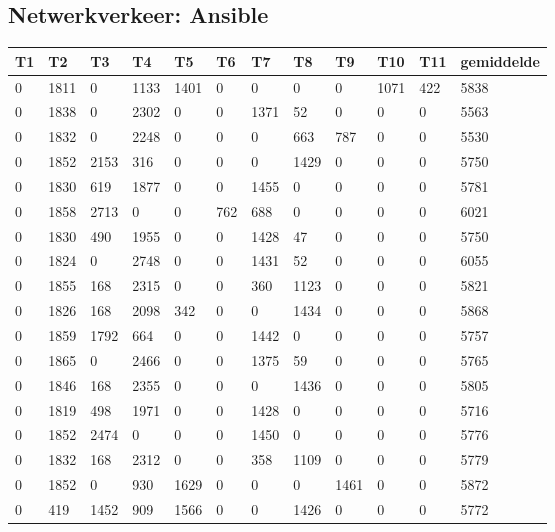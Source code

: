\subsection*{Netwerkverkeer: Ansible}
\label{dataset:netwerkverkeer:ansible}
\begin{longtable}{ | l | l | l | l | l | l | l | l | l | l | l || l | }

	\hline
	T1 & T2 & T3 & T4 & T5 & T6 & T7 & T8 & T9 & T10 & T11 & gemiddelde  \\ \hline
	0 & 1811 & 0 & 1133 & 1401 & 0 & 0 & 0 & 0 & 1071 & 422 & 5838  \\ \hline
	0 & 1838 & 0 & 2302 & 0 & 0 & 1371 & 52 & 0 & 0 & 0 & 5563    \\ \hline
	0 & 1832 & 0 & 2248 & 0 & 0 & 0 & 663 & 787 & 0 & 0 & 5530 \\ \hline
	0 & 1852 & 2153 & 316 & 0 & 0 & 0 & 1429 & 0 & 0 & 0 & 5750  \\ \hline
	0 & 1830 & 619 & 1877 & 0 & 0 & 1455 & 0 & 0 & 0 & 0 & 5781  \\ \hline
	0 & 1858 & 2713 & 0 & 0 & 762 & 688 & 0 & 0 & 0 & 0 & 6021   \\ \hline
	0 & 1830 & 490 & 1955 & 0 & 0 & 1428 & 47 & 0 & 0 & 0 & 5750  \\ \hline
	0 & 1824 & 0 & 2748 & 0 & 0 & 1431 & 52 & 0 & 0 & 0 & 6055   \\ \hline
	0 & 1855 & 168 & 2315 & 0 & 0 & 360 & 1123 & 0 & 0 & 0 & 5821  \\ \hline
	0 & 1826 & 168 & 2098 & 342 & 0 & 0 & 1434 & 0 & 0 & 0 & 5868  \\ \hline
	0 & 1859 & 1792 & 664 & 0 & 0 & 1442 & 0 & 0 & 0 & 0 & 5757 \\ \hline
	0 & 1865 & 0 & 2466 & 0 & 0 & 1375 & 59 & 0 & 0 & 0 & 5765  \\ \hline
	0 & 1846 & 168 & 2355 & 0 & 0 & 0 & 1436 & 0 & 0 & 0 & 5805 \\ \hline
	0 & 1819 & 498 & 1971 & 0 & 0 & 1428 & 0 & 0 & 0 & 0 & 5716   \\ \hline
	0 & 1852 & 2474 & 0 & 0 & 0 & 1450 & 0 & 0 & 0 & 0 & 5776   \\ \hline
	0 & 1832 & 168 & 2312 & 0 & 0 & 358 & 1109 & 0 & 0 & 0 & 5779  \\ \hline
	0 & 1852 & 0 & 930 & 1629 & 0 & 0 & 0 & 1461 & 0 & 0 & 5872    \\ \hline
	0 & 419 & 1452 & 909 & 1566 & 0 & 0 & 1426 & 0 & 0 & 0 & 5772  \\ \hline

\end{longtable}
